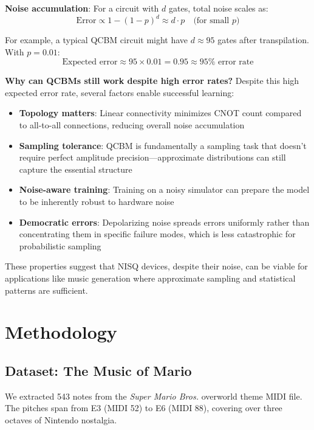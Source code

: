 \documentclass[11pt,a4paper]{article}
\begin{document}
\textbf{Noise accumulation}: For a circuit with $d$ gates, total noise scales as:
\[
\text{Error} \propto 1 - (1-p)^d \approx d \cdot p \quad \text{(for small $p$)}
\]

For example, a typical QCBM circuit might have $d \approx 95$ gates after transpilation. With $p = 0.01$:
\[
\text{Expected error} \approx 95 \times 0.01 = 0.95 \approx 95\% \text{ error rate}
\]

\textbf{Why can QCBMs still work despite high error rates?} Despite this high expected error rate, several factors enable successful learning:

\begin{itemize}
    \item \textbf{Topology matters}: Linear connectivity minimizes CNOT count compared to all-to-all connections, reducing overall noise accumulation
    \item \textbf{Sampling tolerance}: QCBM is fundamentally a sampling task that doesn't require perfect amplitude precision—approximate distributions can still capture the essential structure
    \item \textbf{Noise-aware training}: Training on a noisy simulator can prepare the model to be inherently robust to hardware noise
    \item \textbf{Democratic errors}: Depolarizing noise spreads errors uniformly rather than concentrating them in specific failure modes, which is less catastrophic for probabilistic sampling
\end{itemize}

These properties suggest that NISQ devices, despite their noise, can be viable for applications like music generation where approximate sampling and statistical patterns are sufficient.

\clearpage
\section{Methodology}

\subsection{Dataset: The Music of Mario}

We extracted 543 notes from the \textit{Super Mario Bros.} overworld theme MIDI file. The pitches span from E3 (MIDI 52) to E6 (MIDI 88), covering over three octaves of Nintendo nostalgia.
\end{document}
